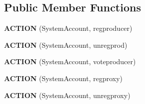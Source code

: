 \subsection*{Public Member Functions}
\begin{DoxyCompactItemize}
\item 
\mbox{\label{classaaciosystem_1_1voting_a1b23b346985cf08ec871486c2e2eff9a}} 
{\bfseries A\+C\+T\+I\+ON} (System\+Account, regproducer)
\item 
\mbox{\label{classaaciosystem_1_1voting_a222cfdc404f0df24024ae7bf7c0f7fdd}} 
{\bfseries A\+C\+T\+I\+ON} (System\+Account, unregprod)
\item 
\mbox{\label{classaaciosystem_1_1voting_ab3aa66d75c632be22f7dd2e861d543e4}} 
{\bfseries A\+C\+T\+I\+ON} (System\+Account, voteproducer)
\item 
\mbox{\label{classaaciosystem_1_1voting_a5f312a4987a0c83f8de87cdfb1b8a983}} 
{\bfseries A\+C\+T\+I\+ON} (System\+Account, regproxy)
\item 
\mbox{\label{classaaciosystem_1_1voting_a3a0ca3251345d5ec48daccced6dfa79a}} 
{\bfseries A\+C\+T\+I\+ON} (System\+Account, unregproxy)
\end{DoxyCompactItemize}
